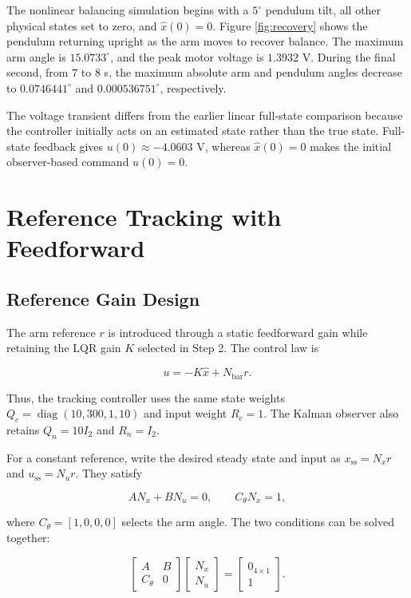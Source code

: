 \documentclass[conference]{IEEEtran}
\newcommand{\diag}{\operatorname{diag}}
\begin{document}
The nonlinear balancing simulation begins with a $5^\circ$ pendulum tilt, all other physical states set to zero, and $\hat x(0)=0$. Figure \ref{fig:recovery} shows the pendulum returning upright as the arm moves to recover balance. The maximum arm angle is $15.0733^\circ$, and the peak motor voltage is $1.3932$ V. During the final second, from $7$ to $8$ s, the maximum absolute arm and pendulum angles decrease to $0.0746441^\circ$ and $0.000536751^\circ$, respectively.

The voltage transient differs from the earlier linear full-state comparison because the controller initially acts on an estimated state rather than the true state. Full-state feedback gives $u(0)\approx-4.0603$ V, whereas $\hat x(0)=0$ makes the initial observer-based command $u(0)=0$.

\section{Reference Tracking with Feedforward}

\subsection{Reference Gain Design}

The arm reference $r$ is introduced through a static feedforward gain while retaining the LQR gain $K$ selected in Step 2. The control law is

\begin{equation}
u=-K\hat x+N_{\mathrm{bar}}r.
\label{eq:feedforward}
\end{equation}

Thus, the tracking controller uses the same state weights $Q_c=\diag(10,300,1,10)$ and input weight $R_c=1$. The Kalman observer also retains $Q_n=10I_2$ and $R_n=I_2$.

For a constant reference, write the desired steady state and input as $x_{\mathrm{ss}}=N_xr$ and $u_{\mathrm{ss}}=N_ur$. They satisfy

\begin{equation}
AN_x+BN_u=0,\qquad C_\theta N_x=1,
\label{eq:steadyconditions}
\end{equation}

where $C_\theta=[1,0,0,0]$ selects the arm angle. The two conditions can be solved together:

\begin{equation}
\begin{bmatrix}A&B\\C_\theta&0\end{bmatrix}
\begin{bmatrix}N_x\\N_u\end{bmatrix}
=\begin{bmatrix}0_{4\times1}\\1\end{bmatrix}.
\label{eq:steadysolve}
\end{equation}
\end{document}
